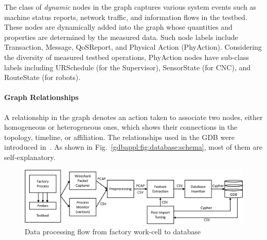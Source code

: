 The class of \textit{dynamic} nodes in the graph captures various system events such as machine status reports, network traffic, and information flows in the testbed. These nodes are dynamically added into the graph whose quantities and properties are determined by the measured data. Such node labels include Transaction, Message, QoSReport, and Physical Action (PhyAction). Considering the diversity of measured testbed operations, PhyAction nodes have sub-class labels including URSchedule (for the Supervisor), SensorState (for CNC), and RouteState (for robots).


\paragraph{Graph Relationships}

A relationship in the graph denotes an action taken to associate two nodes, either homogeneous or heterogeneous ones, which shows their connections in the topology, timeline, or affiliation. The relationships used in the GDB were introduced in~\cite{CandellISIT2020.Conf}. As shown in Fig.~\ref{gdbappl:fig:database:schema}, most of them are self-explanatory. 

\begin{figure}
	\centering
	\includegraphics[width=\textwidth]{chapter-gdb-appl/figures/info_workflow_tii.eps}
	\caption{Data processing flow from factory work-cell to database}
	\label{gdbappl:fig:database:work-flow}
\end{figure}

